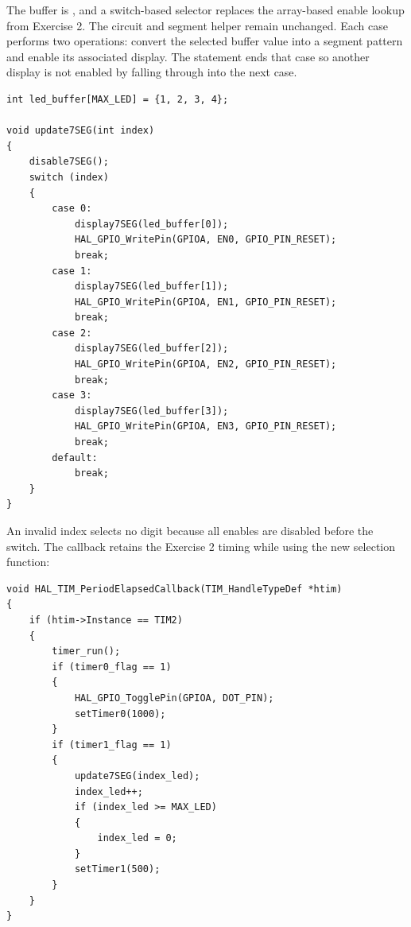 \documentclass[a4paper]{article}
\newcommand{\code}[1]{\texttt{\detokenize{#1}}}
\begin{document}
The buffer is \code{{1, 2, 3, 4}}, and a switch-based selector replaces the
array-based enable lookup from Exercise 2. The circuit and segment helper
remain unchanged. Each case performs two operations: convert the selected
buffer value into a segment pattern and enable its associated display.
The \code{break} statement ends that case so another display is not enabled
by falling through into the next case.
\par\noindent\begin{minipage}{\linewidth}
\begin{lstlisting}[caption={Switch-based update7SEG function}]
int led_buffer[MAX_LED] = {1, 2, 3, 4};

void update7SEG(int index)
{
    disable7SEG();
    switch (index)
    {
        case 0:
            display7SEG(led_buffer[0]);
            HAL_GPIO_WritePin(GPIOA, EN0, GPIO_PIN_RESET);
            break;
        case 1:
            display7SEG(led_buffer[1]);
            HAL_GPIO_WritePin(GPIOA, EN1, GPIO_PIN_RESET);
            break;
        case 2:
            display7SEG(led_buffer[2]);
            HAL_GPIO_WritePin(GPIOA, EN2, GPIO_PIN_RESET);
            break;
        case 3:
            display7SEG(led_buffer[3]);
            HAL_GPIO_WritePin(GPIOA, EN3, GPIO_PIN_RESET);
            break;
        default:
            break;
    }
}
\end{lstlisting}
\end{minipage}\par
An invalid index selects no digit because all enables are disabled before the
switch. The callback retains the Exercise 2 timing while using the new
selection function:
\par\noindent\begin{minipage}{\linewidth}
\begin{lstlisting}[caption={Exercise 3 timer callback}]
void HAL_TIM_PeriodElapsedCallback(TIM_HandleTypeDef *htim)
{
    if (htim->Instance == TIM2)
    {
        timer_run();
        if (timer0_flag == 1)
        {
            HAL_GPIO_TogglePin(GPIOA, DOT_PIN);
            setTimer0(1000);
        }
        if (timer1_flag == 1)
        {
            update7SEG(index_led);
            index_led++;
            if (index_led >= MAX_LED)
            {
                index_led = 0;
            }
            setTimer1(500);
        }
    }
}
\end{lstlisting}
\end{minipage}\par
\end{document}
